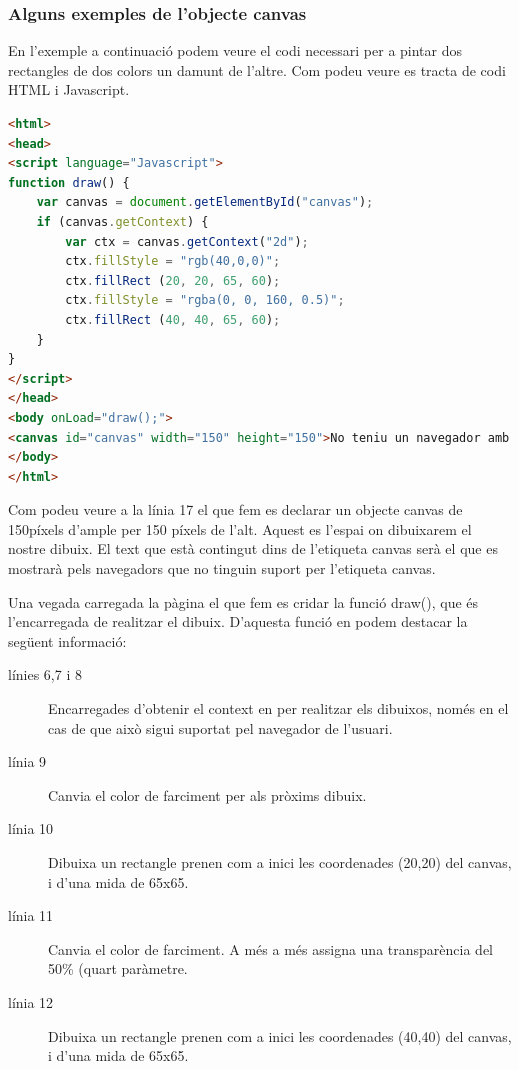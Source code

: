 \subsubsection{Alguns exemples de l'objecte canvas}

En l'exemple a continuació podem veure el codi necessari per a pintar dos rectangles de dos colors un damunt de l'altre. Com podeu veure es tracta de codi HTML i Javascript.  

\begin{lstlisting}[language=html]
<html>
<head>
<script language="Javascript">
function draw() {
    var canvas = document.getElementById("canvas");
    if (canvas.getContext) {
        var ctx = canvas.getContext("2d");
        ctx.fillStyle = "rgb(40,0,0)";
        ctx.fillRect (20, 20, 65, 60);
        ctx.fillStyle = "rgba(0, 0, 160, 0.5)";
        ctx.fillRect (40, 40, 65, 60);
    }
}
</script>
</head>
<body onLoad="draw();">
<canvas id="canvas" width="150" height="150">No teniu un navegador amb suport per visualitzar elements canvias.</canvas>
</body>
</html>
\end{lstlisting}

Com podeu veure a la línia 17 el que fem es declarar un objecte canvas de 150píxels d'ample per 150 píxels de l'alt. Aquest es l'espai on dibuixarem el nostre dibuix. El text que està contingut dins de l'etiqueta canvas serà el que es mostrarà pels navegadors que no tinguin suport per l'etiqueta canvas. 

Una vegada carregada la pàgina el que fem es cridar la funció draw(), que és l'encarregada de realitzar el dibuix. D'aquesta funció en podem destacar la següent informació:

\begin{description}
\item[línies 6,7 i 8]{Encarregades d'obtenir el context en per realitzar els dibuixos, només en el cas de que això sigui suportat pel navegador de l'usuari.}
\item[línia 9]{Canvia el color de farciment per als pròxims dibuix.}
\item[línia 10]{Dibuixa un rectangle prenen com a inici les coordenades (20,20) del canvas, i d'una mida de 65x65.}
\item[línia 11]{Canvia el color de farciment. A més a més assigna una transparència del 50\% (quart paràmetre.}
\item[línia 12]{Dibuixa un rectangle prenen com a inici les coordenades (40,40) del canvas, i d'una mida de 65x65.}
\end{description}

